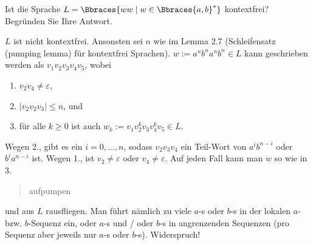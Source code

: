 
\begin{exercise}

Ist die Sprache $L = \Bbraces{w w \mid w \in \Bbraces{a, b}^\ast}$ kontextfrei?
Begründen Sie Ihre Antwort.

\end{exercise}


\begin{solution}

$L$ ist nicht kontextfrei.
Ansonsten sei $n$ wie im Lemma 2.7 (Schleifensatz (pumping lemma) für kontextfrei Sprachen).
$w := a^n b^n a^n b^n \in L$ kann geschrieben werden als $v_1 v_2 v_3 v_4 v_5$, wobei

\begin{enumerate}
    \item $v_2 v_4 \neq \varepsilon$,
    \item $|v_2 v_2 v_3| \leq n$, und
    \item für alle $k \geq 0$ ist auch $w_k := v_1 v_2^k v_3 v_4^k v_5 \in L$.
\end{enumerate}

Wegen 2., gibt es ein $i = 0, \dots, n$, sodass $v_2 v_3 v_4$ ein Teil-Wort von $a^i b^{n-i}$ oder $b^i a^{n-i}$ ist.
Wegen 1., ist $v_2 \neq \varepsilon$ oder $v_4 \neq \varepsilon$.
Auf jeden Fall kann man $w$ so wie in 3. \blockquote{aufpumpen} und aus $L$ rausfliegen.
Man führt nämlich zu viele $a$-s oder $b$-s in der lokalen $a$- bzw. $b$-Sequenz ein, oder $a$-s und / oder $b$-s in angrenzenden Sequenzen (pro Sequenz aber jeweils nur $a$-s oder $b$-s).
Widerspruch!

\end{solution}

